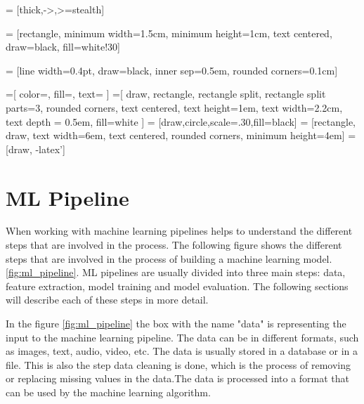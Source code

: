 \usetikzlibrary{shapes,arrows,chains}
\usetikzlibrary[calc]
\usetikzlibrary{shapes.geometric, arrows, fit, calc, automata, positioning, shapes.multipart}
\usepackage{comment}
\renewenvironment{comment}{}{}
     = [thick,->,>=stealth]

     = [rectangle, minimum width=1.5cm, minimum height=1cm, text centered, draw=black, fill=white!30]

     = [line width=0.4pt, draw=black, inner sep=0.5em, rounded corners=0.1cm]

    \usetikzlibrary{shapes.geometric, arrows, fit, calc, automata, positioning}
=[
    color=\umldrawcolor,
    fill=\umlfillcolor,
    text=\umltextcolor
]
=[
    draw,
    rectangle,
    rectangle split,
    rectangle split parts=3,
    rounded corners,
    text centered,
    text height=1em,
    text width=2.2cm,
    text depth = 0.5em,
    fill=white
]
 = [draw,circle,scale=.30,fill=black]
 = [rectangle, draw, text width=6em, text centered, rounded corners, minimum height=4em]
 = [draw, -latex']

\section{ML Pipeline}
When working with machine learning pipelines helps to understand the different steps that are involved in the process. The following figure shows the different steps that are involved in the process of building a machine learning model. \ref*{fig:ml_pipeline}.
ML pipelines are usually divided into three main steps: data, feature extraction, model training and model evaluation. The following sections will describe each of these steps in more detail. 

In the figure \ref*{fig:ml_pipeline} the box with the name "data" is representing the input to the machine learning pipeline. The data can be in different formats, such as images, text, audio, video, etc. The data is usually stored in a database or in a file. This is also the step data cleaning is done, which is the process of removing or replacing missing values in the data.The data is processed into a format that can be used by the machine learning algorithm. 

